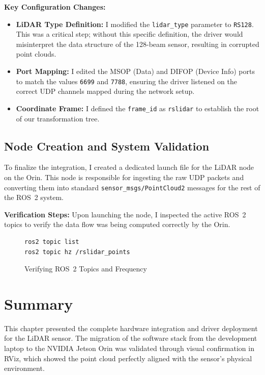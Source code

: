 \documentclass[12pt,a4paper]{report}
\begin{document}
\textbf{Key Configuration Changes:}
\begin{itemize}
    \item \textbf{LiDAR Type Definition:} I modified the \texttt{lidar\_type} parameter to \texttt{RS128}. This was a critical step; without this specific definition, the driver would misinterpret the data structure of the 128-beam sensor, resulting in corrupted point clouds.
    
    \item \textbf{Port Mapping:} I edited the MSOP (Data) and DIFOP (Device Info) ports to match the values \texttt{6699} and \texttt{7788}, ensuring the driver listened on the correct UDP channels mapped during the network setup.
    
    \item \textbf{Coordinate Frame:} I defined the \texttt{frame\_id} as \texttt{rslidar} to establish the root of our transformation tree.
\end{itemize}

\subsection{Node Creation and System Validation}
To finalize the integration, I created a dedicated launch file for the LiDAR node on the Orin. This node is responsible for ingesting the raw UDP packets and converting them into standard \texttt{sensor\_msgs/PointCloud2} messages for the rest of the ROS~2 system.

\textbf{Verification Steps:} Upon launching the node, I inspected the active ROS~2 topics to verify the data flow was being computed correctly by the Orin.

\begin{figure}[ht!]
    \centering
    \begin{verbatim}
ros2 topic list
ros2 topic hz /rslidar_points
    \end{verbatim}
    \caption{Verifying ROS~2 Topics and Frequency}
\end{figure}

\section{Summary}
This chapter presented the complete hardware integration and driver deployment for the LiDAR sensor. The migration of the software stack from the development laptop to the NVIDIA Jetson Orin was validated through visual confirmation in RViz, which showed the point cloud perfectly aligned with the sensor's physical environment.
\end{document}
